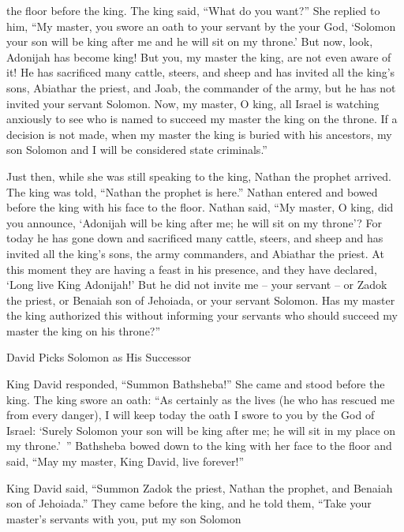 {the floor before
the king.
The king
said,
“What do you want?”
She replied
to him, “My master,
you
swore
an oath to your servant
by the
{}
your God,
‘Solomon
your son
will be king
after
me and he
will sit
on
my throne.’
But now,
look,
Adonijah
has become king! But
you, my master
the king,
are not
even aware of it!
He has sacrificed many cattle,
steers,
and sheep
and has invited
all
the king’s
sons,
Abiathar
the priest,
and Joab,
the commander
of the army,
but he has not
invited
your servant
Solomon.
Now,
my master,
O
king,
all
Israel
is
watching
anxiously to see
who
is named to succeed
my master
the king
on
the throne.
If
a decision
is not made, when
my master
the king
is buried with
his ancestors,
my son
Solomon
and I
will be
considered state
criminals.”
\par }{\PP {}Just then, while
she was still
speaking
to the king,
Nathan
the prophet
arrived.
The king
was told,
“Nathan
the prophet
is here.”
Nathan entered
and bowed
before
the king
with his face
to the floor.
Nathan
said,
“My master,
O
king,
did you
announce,
‘Adonijah
will be king
after
me; he will sit
on
my throne’?
For
today
he has gone down
and sacrificed
many cattle,
steers,
and sheep
and has invited
all
the king’s
sons,
the army
commanders,
and Abiathar
the priest.
At this moment
they are having
a feast
in his presence,
and they have declared,
‘Long live
King
Adonijah!’
But
he did not
invite
me
– your servant
– or Zadok
the priest,
or Benaiah
son
of Jehoiada,
or your servant
Solomon.
Has my
master
the king
authorized
this
without
informing
your servants
who
should succeed
my master
the king
on
his throne?”
\par }{\SH David Picks Solomon as His Successor
\par }{\PP {}King
David
responded, “Summon
Bathsheba!” She came
and stood
before
the king.
The king
swore
an oath: “As certainly as the
{}
lives
(he who
has rescued
me
from every
danger),
I will keep
today
the oath I swore
to you by the
{}
God
of Israel: ‘Surely
Solomon
your son
will be king
after
me; he
will sit
in my place
on
my throne.’ ”
Bathsheba
bowed
down to the king
with her face
to the floor
and said,
“May my master,
King
David,
live
forever!”
\par }{\PP {}King
David
said,
“Summon
Zadok
the priest,
Nathan
the prophet,
and Benaiah
son
of Jehoiada.”
They came
before
the king,
and he told
them, “Take
your master’s
servants
with
you, put
my son
Solomon
}

